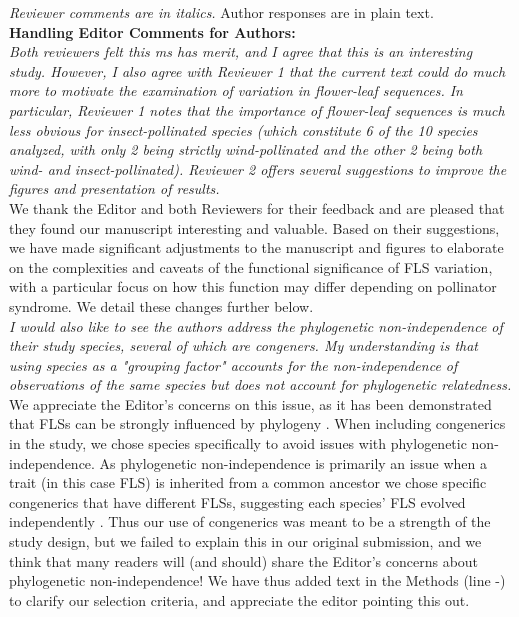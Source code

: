 \documentclass[11pt]{article}
\begin{document}
\emph{Reviewer comments are in italics.} Author responses are in plain text.\\

\textbf{Handling Editor Comments for Authors:}\\

\emph{Both reviewers felt this ms has merit, and I agree that this is an interesting study. However, I also agree with Reviewer 1 that the current text could do much more to motivate the examination of variation in flower-leaf sequences. In particular, Reviewer 1 notes that the importance of flower-leaf sequences is much less obvious for insect-pollinated species (which constitute 6 of the 10 species analyzed, with only 2 being strictly wind-pollinated and the other 2 being both wind- and insect-pollinated). Reviewer 2 offers several suggestions to improve the figures and presentation of results.}\\

\noindent We thank the Editor and both Reviewers for their feedback and are pleased that they found our manuscript interesting and valuable. Based on their suggestions, we have made significant adjustments to the manuscript and figures to elaborate on the complexities and caveats of the functional significance of FLS variation, with a particular focus on how this function may differ depending on pollinator syndrome. We detail these changes further below.\\

\emph{I would also like to see the authors address the phylogenetic non-independence of their study species, several of which are congeners. My understanding is that using species as a "grouping factor" accounts for the non-independence of observations of the same species but does not account for phylogenetic relatedness.}\\

\noindent We appreciate the Editor's concerns on this issue, as it has been demonstrated that FLSs can be strongly influenced by phylogeny \citep{Buonaiuto2020,Gougherty2018}. When including congenerics in the study, we chose species specifically to avoid issues with phylogenetic non-independence. As phylogenetic non-independence is primarily an issue when a trait (in this case FLS) is inherited from a common ancestor we chose specific congenerics that have different FLSs, suggesting each species' FLS evolved independently \citep{Revell:2010aa}. Thus our use of congenerics was meant to be a strength of the study design, but we failed to explain this in our original submission, and we think that many readers will (and should) share the Editor's concerns about phylogenetic non-independence! We have thus added text in the Methods (line -) to clarify our selection criteria, and appreciate the editor pointing this out.\\ %
\end{document}
